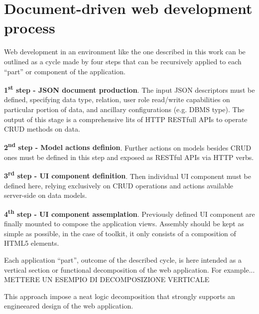 \section{Document-driven web development process}\label{sec:dev-proc}

Web development in an environment like the one described in this work can be outlined as a cycle made by four steps that can be recursively applied to each ``part'' or component of the application. 

{\bf 1\textsuperscript{st} step - JSON document production}. The input JSON descriptors must be defined, specifying data type, relation, user role read/write capabilities on particular portion of data, and ancillary configurations (e.g. DBMS type). The output of this stage is a comprehensive lits of HTTP RESTfull APIs to operate CRUD methods on data.

{\bf 2\textsuperscript{nd} step - Model actions definion}. Further actions on models besides CRUD ones must be defined in this step and exposed as RESTful APIs via HTTP verbs.

{\bf 3\textsuperscript{rd} step - UI component definition}. Then individual UI component must be defined here, relying exclusively on CRUD operations and actions available server-side on data models.

{\bf 4\textsuperscript{th} step - UI component assemplation}. Previously defined UI component are finally mounted to compose the application views. Assembly should be kept as simple as possible, in the case of  toolkit, it only consists of a composition of HTML5 elements.




Each application ``part'', outcome of the described cycle, is here intended as a vertical section or functional decomposition of the web application. 
For example... METTERE UN ESEMPIO DI DECOMPOSIZIONE VERTICALE

This approach impose a neat logic decomposition that strongly supports an engineeared design of the web application.
